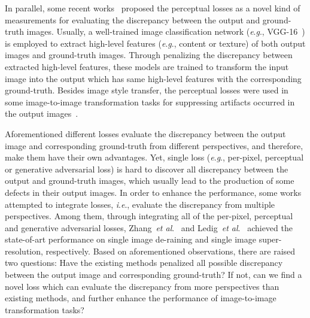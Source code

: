 \documentclass{article}
\newcommand{\etal}{\textit{et al}.}
\newcommand{\ie}{\textit{i}.\textit{e}.}
\newcommand{\eg}{\textit{e}.\textit{g}.}
\begin{document}
In parallel, some recent works~\cite{johnson2016perceptual, dosovitskiy2016generating, bruna2015super} proposed the perceptual losses as a novel kind of measurements for evaluating the discrepancy between the output and ground-truth images. Usually, a well-trained image classification network (\eg, VGG-16~\cite{simonyan2014very}) is employed to extract high-level features (\eg, content or texture) of both output images and ground-truth images. Through penalizing the discrepancy between extracted high-level features, these models are trained to transform the input image into the output which has same high-level features with the corresponding ground-truth. Besides image style transfer, the perceptual losses were used in some image-to-image transformation tasks for suppressing artifacts occurred in the output images~\cite{johnson2016perceptual,zhang2017image}. 

Aforementioned different losses evaluate the discrepancy between the output image and corresponding ground-truth from different perspectives, and therefore, make them have their own advantages. Yet, single loss (\eg, per-pixel, perceptual or generative adversarial loss) is hard to discover all discrepancy between the output and ground-truth images, which usually lead to the production of some defects in their output images. In order to enhance the performance, some works attempted to integrate losses, \ie, evaluate the discrepancy from multiple perspectives. Among them, through integrating all of the per-pixel, perceptual and generative adversarial losses, Zhang~\etal~\cite{zhang2017image} and Ledig~\etal~\cite{ledig2016photo} achieved the state-of-art performance on single image de-raining and single image super-resolution, respectively. 
Based on aforementioned observations, there are raised two questions: Have the existing methods penalized all possible discrepancy between the output image and corresponding ground-truth? If not, can we find a novel loss which can evaluate the discrepancy from more perspectives than existing methods, and further enhance the performance of image-to-image transformation tasks? 
\end{document}
